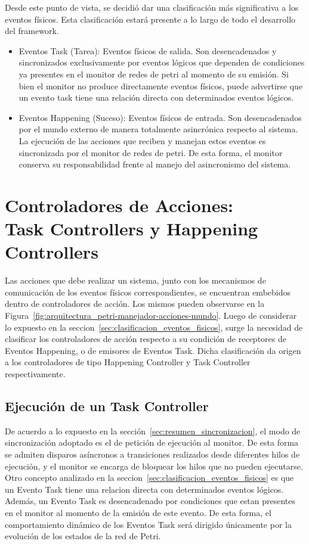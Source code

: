 Desde este punto de vista, se decidió dar una clasificación más significativa a
los eventos físicos. Esta clasificación estará presente a lo largo de todo
el desarrollo del framework.
\begin{itemize}
  \item Eventos Task (Tarea): Eventos físicos de salida. Son
  desencadenados y sincronizados exclusivamente por eventos lógicos que dependen
  de condiciones ya presentes en el monitor de redes de petri al momento de su
  emisión. Si bien el monitor no produce directamente eventos físicos, puede
  advertirse que un evento task tiene una relación directa con determinados
  eventos lógicos.
  \item Eventos Happening (Suceso): Eventos físicos de entrada. Son
  desencadenados por el mundo externo de manera totalmente asincrónica respecto
  al sistema. La ejecución de las acciones que reciben y manejan estos eventos
  es sincronizada por el monitor de redes de petri. De esta forma, el monitor
  conserva su responsabilidad frente al manejo del asincronismo del sistema.
\end{itemize}

\section{Controladores de Acciones: \\ Task Controllers y Happening Controllers}
\label{sec:controladores_de_acciones}
Las acciones que debe realizar un sistema, junto con los mecanismos de
comunicación de los eventos físicos correspondientes, se encuentran embebidos
dentro de controladores de acción. Los mismos pueden observarse en la
Figura~\ref{fig:arquitectura_petri-manejador-acciones-mundo}. 
Luego de considerar lo expuesto en la
seccion~\ref{sec:clasificacion_eventos_fisicos}, surge la necesidad de
clasificar los controladores de acción respecto a su condición de receptores de
Eventos Happening, o de emisores de Eventos Task. Dicha clasificación
da origen a los controladores de tipo Happening Controller y Task
Controller respectivamente.

\subsection{Ejecución de un Task Controller}
\label{sec:ejecucion_task_controller}
De acuerdo a lo expuesto en la sección~\ref{sec:resumen_sincronizacion}, el 
modo de sincronización adoptado es el de petición de ejecución al monitor. 
De esta forma se admiten disparos asíncronos a transiciones realizados desde
diferentes hilos de ejecución, y el monitor se encarga de bloquear los hilos que
no pueden ejecutarse.
Otro concepto analizado en la seccion~\ref{sec:clasificacion_eventos_fisicos}
es que un Evento Task tiene una
relacion directa con determinados eventos lógicos. Además, un Evento Task es
desencadenado por condiciones que estan presentes en el monitor al momento de
la emisión de este evento. De esta forma, el comportamiento dinámico de los
Eventos Task será dirigido únicamente por la evolución de los estados de la red
de Petri.

